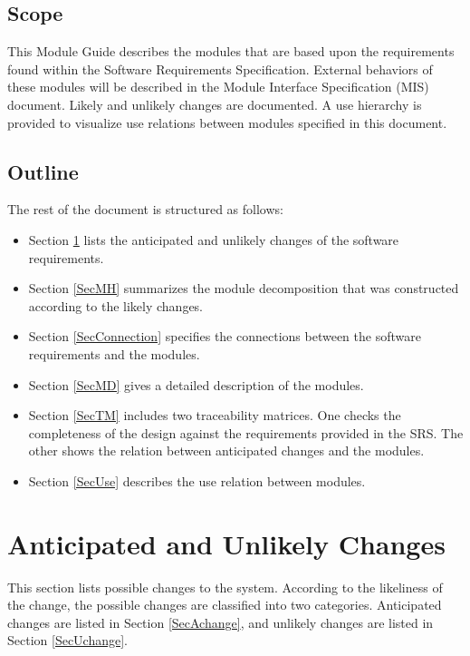 \documentclass[12pt, titlepage]{article}
\begin{document}
	\subsection{Scope}
	This Module Guide describes the modules that are based upon the requirements found within the Software Requirements Specification. External behaviors of these modules will be described in the Module Interface Specification (MIS) document. Likely and unlikely changes are documented. A use hierarchy is provided to visualize use relations between modules specified in this document.
	\subsection{Outline}
	The rest of the document is structured as follows:
	
	\begin{itemize}
		\item Section \ref{SecChange} lists the anticipated and unlikely changes of the software requirements. 
		\item Section \ref{SecMH} summarizes the module decomposition that was constructed according to the likely changes. 
		\item Section \ref{SecConnection} specifies the connections between the software requirements and the modules. \item Section \ref{SecMD} gives a detailed description of the modules. 
		\item Section \ref{SecTM} includes two traceability matrices. One checks the completeness of the design against the requirements provided in the SRS. The other shows the relation between anticipated changes and the modules. 
		\item Section \ref{SecUse} describes the use relation between modules. 
	\end{itemize}
	
	
	
	
	
	\section{Anticipated and Unlikely Changes} \label{SecChange}
	
	This section lists possible changes to the system. According to the likeliness
	of the change, the possible changes are classified into two
	categories. Anticipated changes are listed in Section \ref{SecAchange}, and
	unlikely changes are listed in Section \ref{SecUchange}.
	
\end{document}
